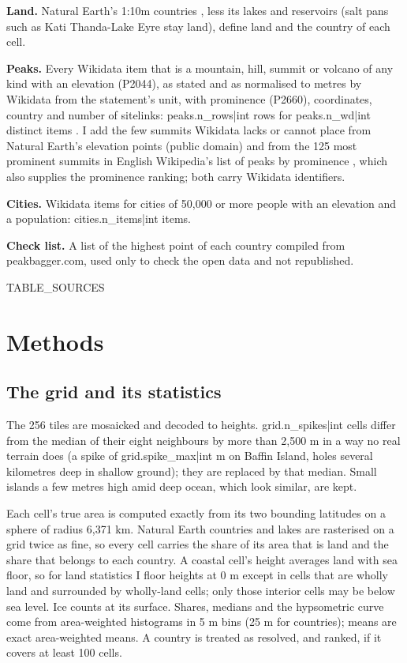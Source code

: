 \documentclass[11pt,a4paper]{article}
\begin{document}
\textbf{Land.} Natural Earth's 1:10m countries \citep{naturalearth}, less its lakes and reservoirs (salt pans such as Kati Thanda-Lake Eyre stay land), define land and the country of each cell.

\textbf{Peaks.} Every Wikidata item that is a mountain, hill, summit or volcano of any kind with an elevation (P2044), as stated and as normalised to metres by Wikidata from the statement's unit, with prominence (P2660), coordinates, country and number of sitelinks: {{peaks.n_rows|int}} rows for {{peaks.n_wd|int}} distinct items \citep{wikidata}. I add the few summits Wikidata lacks or cannot place from Natural Earth's elevation points (public domain) and from the 125 most prominent summits in English Wikipedia's list of peaks by prominence \citep{wpprom}, which also supplies the prominence ranking; both carry Wikidata identifiers.

\textbf{Cities.} Wikidata items for cities of 50,000 or more people with an elevation and a population: {{cities.n_items|int}} items.

\textbf{Check list.} A list of the highest point of each country compiled from peakbagger.com, used only to check the open data and not republished.

{{TABLE_SOURCES}}

\section{Methods}
\subsection{The grid and its statistics}
The 256 tiles are mosaicked and decoded to heights. {{grid.n_spikes|int}} cells differ from the median of their eight neighbours by more than 2,500 m in a way no real terrain does (a spike of {{grid.spike_max|int}} m on Baffin Island, holes several kilometres deep in shallow ground); they are replaced by that median. Small islands a few metres high amid deep ocean, which look similar, are kept.

Each cell's true area is computed exactly from its two bounding latitudes on a sphere of radius 6,371 km. Natural Earth countries and lakes are rasterised on a grid twice as fine, so every cell carries the share of its area that is land and the share that belongs to each country. A coastal cell's height averages land with sea floor, so for land statistics I floor heights at 0 m except in cells that are wholly land and surrounded by wholly-land cells; only those interior cells may be below sea level. Ice counts at its surface. Shares, medians and the hypsometric curve come from area-weighted histograms in 5 m bins (25 m for countries); means are exact area-weighted means. A country is treated as resolved, and ranked, if it covers at least 100 cells.
\end{document}
